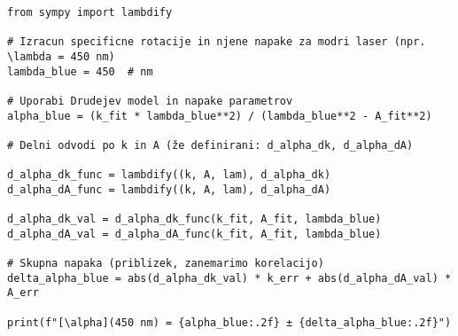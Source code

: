 \documentclass[14pt]{extarticle}
\begin{document}
\begin{lstlisting}
from sympy import lambdify

# Izracun specificne rotacije in njene napake za modri laser (npr. \lambda = 450 nm)
lambda_blue = 450  # nm

# Uporabi Drudejev model in napake parametrov
alpha_blue = (k_fit * lambda_blue**2) / (lambda_blue**2 - A_fit**2)

# Delni odvodi po k in A (že definirani: d_alpha_dk, d_alpha_dA)

d_alpha_dk_func = lambdify((k, A, lam), d_alpha_dk)
d_alpha_dA_func = lambdify((k, A, lam), d_alpha_dA)

d_alpha_dk_val = d_alpha_dk_func(k_fit, A_fit, lambda_blue)
d_alpha_dA_val = d_alpha_dA_func(k_fit, A_fit, lambda_blue)

# Skupna napaka (priblizek, zanemarimo korelacijo)
delta_alpha_blue = abs(d_alpha_dk_val) * k_err + abs(d_alpha_dA_val) * A_err

print(f"[\alpha](450 nm) = {alpha_blue:.2f} ± {delta_alpha_blue:.2f}")
\end{lstlisting}
\end{document}
